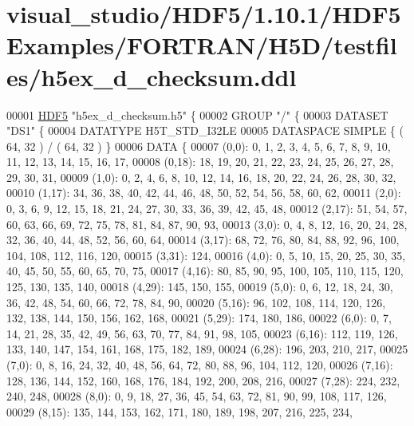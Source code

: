 \hypertarget{visual__studio_2_h_d_f5_21_810_81_2_h_d_f5_examples_2_f_o_r_t_r_a_n_2_h5_d_2testfiles_2h5ex__d__checksum_8ddl_source}{}\section{visual\+\_\+studio/\+H\+D\+F5/1.10.1/\+H\+D\+F5\+Examples/\+F\+O\+R\+T\+R\+A\+N/\+H5\+D/testfiles/h5ex\+\_\+d\+\_\+checksum.ddl}
\label{visual__studio_2_h_d_f5_21_810_81_2_h_d_f5_examples_2_f_o_r_t_r_a_n_2_h5_d_2testfiles_2h5ex__d__checksum_8ddl_source}

\begin{DoxyCode}
00001 \hyperlink{namespace_h_d_f5}{HDF5} \textcolor{stringliteral}{"h5ex\_d\_checksum.h5"} \{
00002 GROUP \textcolor{stringliteral}{"/"} \{
00003    DATASET \textcolor{stringliteral}{"DS1"} \{
00004       DATATYPE  H5T\_STD\_I32LE
00005       DATASPACE  SIMPLE \{ ( 64, 32 ) / ( 64, 32 ) \}
00006       DATA \{
00007       (0,0): 0, 1, 2, 3, 4, 5, 6, 7, 8, 9, 10, 11, 12, 13, 14, 15, 16, 17,
00008       (0,18): 18, 19, 20, 21, 22, 23, 24, 25, 26, 27, 28, 29, 30, 31,
00009       (1,0): 0, 2, 4, 6, 8, 10, 12, 14, 16, 18, 20, 22, 24, 26, 28, 30, 32,
00010       (1,17): 34, 36, 38, 40, 42, 44, 46, 48, 50, 52, 54, 56, 58, 60, 62,
00011       (2,0): 0, 3, 6, 9, 12, 15, 18, 21, 24, 27, 30, 33, 36, 39, 42, 45, 48,
00012       (2,17): 51, 54, 57, 60, 63, 66, 69, 72, 75, 78, 81, 84, 87, 90, 93,
00013       (3,0): 0, 4, 8, 12, 16, 20, 24, 28, 32, 36, 40, 44, 48, 52, 56, 60, 64,
00014       (3,17): 68, 72, 76, 80, 84, 88, 92, 96, 100, 104, 108, 112, 116, 120,
00015       (3,31): 124,
00016       (4,0): 0, 5, 10, 15, 20, 25, 30, 35, 40, 45, 50, 55, 60, 65, 70, 75,
00017       (4,16): 80, 85, 90, 95, 100, 105, 110, 115, 120, 125, 130, 135, 140,
00018       (4,29): 145, 150, 155,
00019       (5,0): 0, 6, 12, 18, 24, 30, 36, 42, 48, 54, 60, 66, 72, 78, 84, 90,
00020       (5,16): 96, 102, 108, 114, 120, 126, 132, 138, 144, 150, 156, 162, 168,
00021       (5,29): 174, 180, 186,
00022       (6,0): 0, 7, 14, 21, 28, 35, 42, 49, 56, 63, 70, 77, 84, 91, 98, 105,
00023       (6,16): 112, 119, 126, 133, 140, 147, 154, 161, 168, 175, 182, 189,
00024       (6,28): 196, 203, 210, 217,
00025       (7,0): 0, 8, 16, 24, 32, 40, 48, 56, 64, 72, 80, 88, 96, 104, 112, 120,
00026       (7,16): 128, 136, 144, 152, 160, 168, 176, 184, 192, 200, 208, 216,
00027       (7,28): 224, 232, 240, 248,
00028       (8,0): 0, 9, 18, 27, 36, 45, 54, 63, 72, 81, 90, 99, 108, 117, 126,
00029       (8,15): 135, 144, 153, 162, 171, 180, 189, 198, 207, 216, 225, 234,

\end{DoxyCode}
